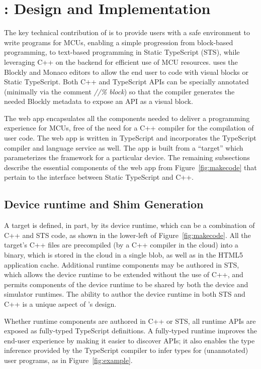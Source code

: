 \section{\MCN: Design and Implementation}
\label{sec:makecode}
The key technical contribution of \MC is to provide users with a safe environment 
to write programs for MCUs, enabling a simple progression from block-based
programming, to text-based programming in Static TypeScript (STS), 
while leveraging C++ on the backend for efficient use of MCU resources.
\MC uses the Blockly and Monaco editors to allow the end user to code with
visual blocks or Static TypeScript.
Both C++ and TypeScript APIs can be specially annotated (minimally via the
comment \emph{//\% block}) so that the \MC compiler generates the needed
Blockly metadata to expose an API as a visual block.

The web app encapsulates all the components needed to deliver a programming experience
for MCUs, free of the need for a C++ compiler for the compilation of user code.
The web app is written in TypeScript and incorporates the TypeScript compiler and
language service as well.
The app is built from a \MC ``target''
which parameterizes the \MC framework for a particular device.
The remaining subsections describe the essential components of the web app 
from Figure~\ref{fig:makecode} that pertain to the interface between
Static TypeScript and C++.


\subsection{Device runtime and Shim Generation}

A \MC target is defined, in part, by its device runtime, which can be a combination of C++
and STS code, as shown in the lower-left of Figure~\ref{fig:makecode}.
All the target's C++ files are precompiled (by a C++ compiler in the cloud)
into a binary, which is stored in the cloud in a single blob, as well as in the HTML5 application cache. Additional runtime
components may be authored in STS, which allows the device runtime to be extended without the
use of C++, and permits components of the device runtime to be shared by both the device
and simulator runtimes. The ability to author the device runtime in both STS and C++ is
a unique aspect of \MCN's design.

Whether runtime components are authored in C++ or STS, all runtime APIs are exposed as fully-typed
TypeScript definitions. A fully-typed runtime improves the end-user experience
by making it easier to discover APIs; it also enables the type inference provided by the TypeScript
compiler to infer types for (unannotated) user programs, as in Figure~\ref{fig:example}.

